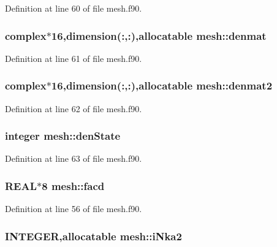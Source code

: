 Definition at line 60 of file mesh.f90.

\hypertarget{namespacemesh_ad78af6f9bdcc56004176e07e81d419f8}{
\subsubsection[{denmat}]{\setlength{\rightskip}{0pt plus 5cm}complex$\ast$16,dimension(:,:),allocatable {\bf mesh::denmat}}}
\label{namespacemesh_ad78af6f9bdcc56004176e07e81d419f8}


Definition at line 61 of file mesh.f90.

\hypertarget{namespacemesh_ac1de4684ee911518c05caaa4c6dcf484}{
\subsubsection[{denmat2}]{\setlength{\rightskip}{0pt plus 5cm}complex$\ast$16,dimension(:,:),allocatable {\bf mesh::denmat2}}}
\label{namespacemesh_ac1de4684ee911518c05caaa4c6dcf484}


Definition at line 62 of file mesh.f90.

\hypertarget{namespacemesh_a451ed2546542175ea54b5c9a780b5462}{
\subsubsection[{denState}]{\setlength{\rightskip}{0pt plus 5cm}integer {\bf mesh::denState}}}
\label{namespacemesh_a451ed2546542175ea54b5c9a780b5462}


Definition at line 63 of file mesh.f90.

\hypertarget{namespacemesh_a43130e9d2b4c80b7862ea7d6226a7a4d}{
\subsubsection[{facd}]{\setlength{\rightskip}{0pt plus 5cm}REAL$\ast$8 {\bf mesh::facd}}}
\label{namespacemesh_a43130e9d2b4c80b7862ea7d6226a7a4d}


Definition at line 56 of file mesh.f90.

\hypertarget{namespacemesh_a6103232aa20c5d4619b9016bda1e0cbe}{
\subsubsection[{iNka2}]{\setlength{\rightskip}{0pt plus 5cm}INTEGER,allocatable {\bf mesh::iNka2}}}
\label{namespacemesh_a6103232aa20c5d4619b9016bda1e0cbe}


